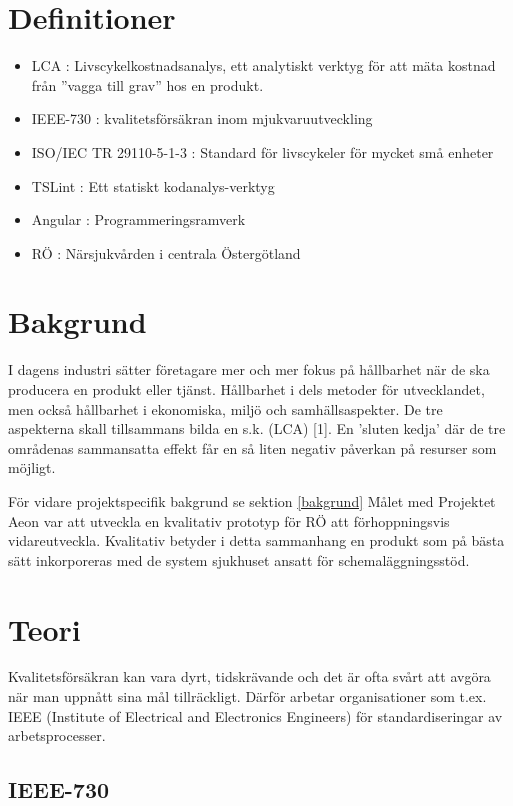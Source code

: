 \section{Definitioner}
\begin{itemize}
	\item LCA :  Livscykelkostnadsanalys, ett analytiskt verktyg för att mäta kostnad från ''vagga till grav'' hos en produkt.
	\item IEEE-730 : kvalitetsförsäkran inom mjukvaruutveckling
	\item ISO/IEC TR 29110-5-1-3 : Standard för livscykeler för mycket små enheter
	\item TSLint : Ett statiskt kodanalys-verktyg
	\item Angular : Programmeringsramverk
	\item RÖ : Närsjukvården i centrala Östergötland
\end{itemize}

\section{Bakgrund}
I dagens industri sätter företagare mer och mer fokus på hållbarhet när de ska producera en produkt eller tjänst. Hållbarhet i dels metoder för utvecklandet, men också hållbarhet i ekonomiska, miljö och samhällsaspekter.
De tre aspekterna skall tillsammans bilda en s.k. (LCA) [1]. En ’sluten kedja’ där de tre områdenas sammansatta effekt får en så liten negativ påverkan på resurser som möjligt.

För vidare projektspecifik bakgrund se sektion \ref{bakgrund}
Målet med Projektet Aeon var att utveckla en kvalitativ prototyp för RÖ att förhoppningsvis vidareutveckla. Kvalitativ betyder i detta sammanhang en produkt som på bästa sätt inkorporeras med de system sjukhuset ansatt för schemaläggningsstöd.

\section{Teori}

Kvalitetsförsäkran kan vara dyrt, tidskrävande och det är ofta svårt att avgöra när man uppnått sina mål tillräckligt.\cite{lighthouse}
Därför arbetar organisationer som t.ex. IEEE (Institute of Electrical and Electronics Engineers) för standardiseringar av arbetsprocesser.

\subsection{IEEE-730}


